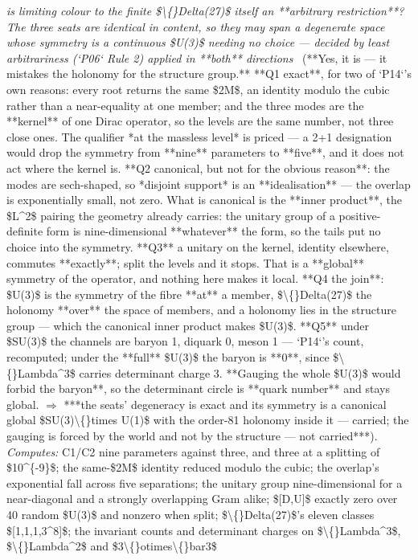 \begin{description}
\textit{is limiting colour to the finite \$\textbackslash\{\}Delta(27)\$ itself an **arbitrary restriction**? The three seats are identical in content, so they may span a degenerate space whose symmetry is a continuous \$U(3)\$ needing no choice --- decided by least arbitrariness (`P06` Rule 2) applied in **both** directions} \ (**Yes, it is --- it mistakes the holonomy for the structure group.**  **Q1 exact**, for two of `P14`'s own reasons: every root returns the same \$2M\$, an identity modulo the cubic rather than a near-equality at one member; and the three modes are the **kernel** of one Dirac operator, so the levels are the same number, not three close ones. The qualifier *at the massless level* is priced --- a 2+1 designation would drop the symmetry from **nine** parameters to **five**, and it does not act where the kernel is.  **Q2 canonical, but not for the obvious reason**: the modes are sech-shaped, so *disjoint support* is an **idealisation** --- the overlap is exponentially small, not zero. What is canonical is the **inner product**, the \$L\textasciicircum{}2\$ pairing the geometry already carries: the unitary group of a positive-definite form is nine-dimensional **whatever** the form, so the tails put no choice into the symmetry.  **Q3** a unitary on the kernel, identity elsewhere, commutes **exactly**; split the levels and it stops. That is a **global** symmetry of the operator, and nothing here makes it local.  **Q4 the join**: \$U(3)\$ is the symmetry of the fibre **at** a member, \$\textbackslash\{\}Delta(27)\$ the holonomy **over** the space of members, and a holonomy lies in the structure group --- which the canonical inner product makes \$U(3)\$.  **Q5** under \$SU(3)\$ the channels are baryon 1, diquark 0, meson 1 --- `P14`'s count, recomputed; under the **full** \$U(3)\$ the baryon is **0**, since \$\textbackslash\{\}Lambda\textasciicircum{}3\$ carries determinant charge 3. **Gauging the whole \$U(3)\$ would forbid the baryon**, so the determinant circle is **quark number** and stays global. \ensuremath{\Rightarrow} ***the seats' degeneracy is exact and its symmetry is a canonical global \$SU(3)\textbackslash\{\}times U(1)\$ with the order-81 holonomy inside it --- carried; the gauging is forced by the world and not by the structure --- not carried***). 
\emph{Computes:} C1/C2 nine parameters against three, and three at a splitting of \$10\textasciicircum{}\{-9\}\$; the same-\$2M\$ identity reduced modulo the cubic; the overlap's exponential fall across five separations; the unitary group nine-dimensional for a near-diagonal and a strongly overlapping Gram alike; \$[D,U]\$ exactly zero over 40 random \$U(3)\$ and nonzero when split; \$\textbackslash\{\}Delta(27)\$'s eleven classes \$[1,1,1,3\textasciicircum{}8]\$; the invariant counts and determinant charges on \$\textbackslash\{\}Lambda\textasciicircum{}3\$, \$\textbackslash\{\}Lambda\textasciicircum{}2\$ and \$3\textbackslash\{\}otimes\textbackslash\{\}bar3\$

\end{description}
